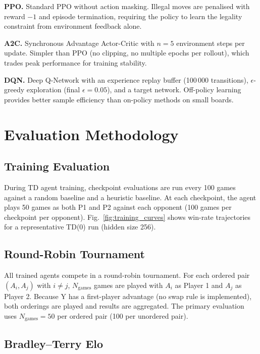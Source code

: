 \documentclass[conference]{IEEEtran}
\begin{document}
\textbf{PPO.} Standard PPO without action masking. Illegal moves are penalised
with reward $-1$ and episode termination, requiring the policy to learn the
legality constraint from environment feedback alone.

\textbf{A2C.} Synchronous Advantage Actor-Critic with $n = 5$ environment steps
per update. Simpler than PPO (no clipping, no multiple epochs per rollout), which
trades peak performance for training stability.

\textbf{DQN.} Deep Q-Network \cite{mnih2015} with an experience replay buffer
(100\,000 transitions), $\epsilon$-greedy exploration (final $\epsilon = 0.05$),
and a target network. Off-policy learning provides better sample efficiency than
on-policy methods on small boards.



\section{Evaluation Methodology}

\subsection{Training Evaluation}

During TD agent training, checkpoint evaluations are run every 100 games against
a random baseline and a heuristic baseline. At each checkpoint, the agent plays
50 games as both P1 and P2 against each opponent (100 games per checkpoint per
opponent). Fig.~\ref{fig:training_curves} shows win-rate trajectories for a
representative TD(0) run (hidden size 256).

\subsection{Round-Robin Tournament}

All trained agents compete in a round-robin tournament. For each ordered pair
$(A_i, A_j)$ with $i \neq j$, $N_{\text{games}}$ games are played with $A_i$ as
Player 1 and $A_j$ as Player 2. Because Y has a first-player advantage (no swap
rule is implemented), both orderings are played and results are aggregated. The
primary evaluation uses $N_{\text{games}} = 50$ per ordered pair (100 per
unordered pair).

\subsection{Bradley--Terry Elo}
\end{document}
